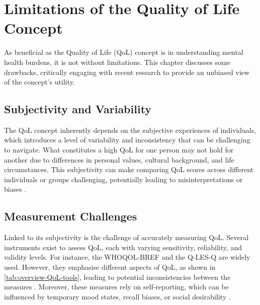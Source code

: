 \documentclass[10pt]{article}
\begin{document}
\begin{sloppypar}
  \section{Limitations of the Quality of Life Concept}
  \label{sec:limitations}

  As beneficial as the Quality of Life (QoL) concept is in understanding mental health burdens, it is not without limitations. This chapter discusses some drawbacks, critically engaging with recent research to provide an unbiased view of the concept's utility.

  \subsection{Subjectivity and Variability}
  \label{subsec:subjectivity}
  The QoL concept inherently depends on the subjective experiences of individuals, which introduces a level of variability and inconsistency that can be challenging to navigate. What constitutes a high QoL for one person may not hold for another due to differences in personal values, cultural background, and life circumstances. This subjectivity can make comparing QoL scores across different individuals or groups challenging, potentially leading to misinterpretations or biases \citep{skevington_expecting_2012}.

  \subsection{Measurement Challenges}
  \label{subsec:measurement}
  Linked to its subjectivity is the challenge of accurately measuring QoL. Several instruments exist to assess QoL, each with varying sensitivity, reliability, and validity levels. For instance, the WHOQOL-BREF and the Q-LES-Q are widely used. However, they emphasise different aspects of QoL, as shown in \autoref{tab:overview-QoL-tools}, leading to potential inconsistencies between the measures \citep{endicott_quality_1993,harper_development_1998}. Moreover, these measures rely on self-reporting, which can be influenced by temporary mood states, recall biases, or social desirability \citep{bowling_just_2005}.


\end{sloppypar}
\end{document}
